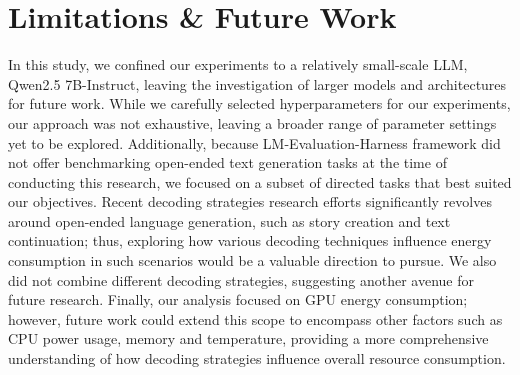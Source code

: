 \section{Limitations \& Future Work}
\label{limitation}

In this study, we confined our experiments to a relatively small-scale LLM, Qwen2.5 7B-Instruct, leaving the investigation of larger models and architectures for future work. While we carefully selected hyperparameters for our experiments, our approach was not exhaustive, leaving a broader range of parameter settings yet to be explored. Additionally, because LM-Evaluation-Harness framework did not offer benchmarking open-ended text generation tasks at the time of conducting this research, we focused on a subset of directed tasks that best suited our objectives. Recent decoding strategies research efforts significantly revolves around open-ended language generation, such as story creation and text continuation; thus, exploring how various decoding techniques influence energy consumption in such scenarios would be a valuable direction to pursue. We also did not combine different decoding strategies, suggesting another avenue for future research. Finally, our analysis focused on GPU energy consumption; however, future work could extend this scope to encompass other factors such as CPU power usage, memory and temperature, providing a more comprehensive understanding of how decoding strategies influence overall resource consumption.
